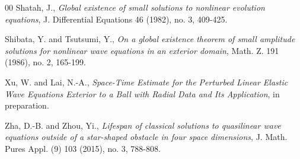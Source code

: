 \documentclass[11pt, reqno]{amsart}
\theoremstyle{definition}
\theoremstyle{remark}
\theoremstyle{definition}
\numberwithin{equation}{section}
\numberwithin{equation}{section}
\begin{document}
\begin{thebibliography}{00}
{Shatah, J.}, \textit{\emph Global existence of small solutions to nonlinear evolution equations}, J. Differential Equations 46 (1982), no. 3, 409-425.

{Shibata, Y. and Tsutsumi, Y.}, \textit{\emph On a global existence theorem of small amplitude solutions for nonlinear wave equations in an exterior domain}, 
Math. Z. 191 (1986), no. 2, 165-199.


{Xu, W. and Lai, N.-A.}, \textit{\emph Space-Time Estimate for the Perturbed Linear Elastic Wave Equations Exterior to a Ball with Radial Data and Its 
Application}, in preparation.

{Zha, D.-B. and Zhou, Yi.}, \textit{\emph Lifespan of classical solutions to quasilinear wave equations outside of a star-shaped obstacle in four space 
dimensions}, J. Math. Pures Appl. (9) 103 (2015), no. 3, 788-808.



\end{thebibliography}
\end{document}

